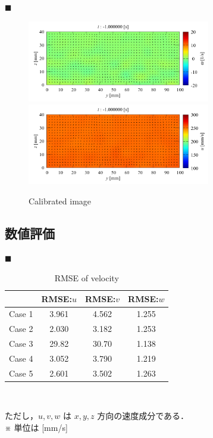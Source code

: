\documentclass[twocolumn,a4j]{jsarticle}
\begin{document}
$\blacksquare$ 
\begin{figure}[htbp]
  \centering
  {\includegraphics[keepaspectratio, width=80mm]{../images/uniform/velocity_and_vorticity}
    \includegraphics[keepaspectratio, width=80mm]{../images/uniform/velocity_xyz}
  }
  \caption{Calibrated image}
\end{figure}

\newpage
\subsection{数値評価}

$\blacksquare$ 
\begin{table}[hbtp]
  \centering
  \caption{RMSE of velocity}
  \begin{tabular}{c c c c}
    \hline
           & RMSE:$u$ & RMSE:$v$ & RMSE:$w$ \\ \hline
    Case 1 & 3.961    & 4.562    & 1.255    \\ \hline
    Case 2 & 2.030    & 3.182    & 1.253    \\ \hline
    Case 3 & 29.82    & 30.70    & 1.138    \\ \hline
    Case 4 & 3.052    & 3.790    & 1.219    \\ \hline
    Case 5 & 2.601    & 3.502    & 1.263    \\ \hline
  \end{tabular}\\
\end{table}

ただし，$u, v, w$ は $x, y, z$ 方向の速度成分である．\\
※ 単位は [mm/s] \\
\end{document}
